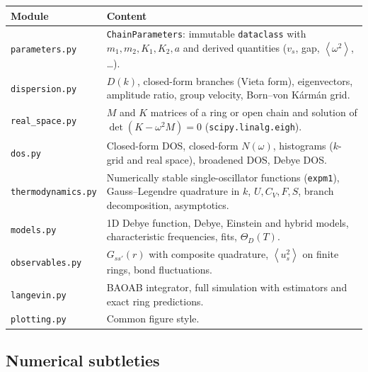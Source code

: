 \documentclass[11pt,a4paper]{article}
\newcommand{\avg}[1]{\left\langle #1\right\rangle}
\newcommand{\vs}{v_{s}}
\newcommand{\code}[1]{\texttt{#1}}
\begin{document}
\begin{center}
\small
\begin{tabularx}{\textwidth}{@{}l X@{}}
\toprule
Module & Content\\
\midrule
\code{parameters.py} & \code{ChainParameters}: immutable \code{dataclass} with $m_1,m_2,K_1,K_2,a$ and derived quantities ($\vs$, gap, $\avg{\omega^2}$, \dots).\\
\code{dispersion.py} & $D(k)$, closed-form branches (Vieta form), eigenvectors, amplitude ratio, group velocity, Born–von Kármán grid.\\
\code{real\_space.py} & $M$ and $K$ matrices of a ring or open chain and solution of $\det(K-\omega^2M)=0$ (\code{scipy.linalg.eigh}).\\
\code{dos.py} & Closed-form DOS, closed-form $N(\omega)$, histograms ($k$-grid and real space), broadened DOS, Debye DOS.\\
\code{thermodynamics.py} & Numerically stable single-oscillator functions (\code{expm1}), Gauss–Legendre quadrature in $k$, $U,C_V,F,S$, branch decomposition, asymptotics.\\
\code{models.py} & 1D Debye function, Debye, Einstein and hybrid models, characteristic frequencies, fits, $\Theta_D(T)$.\\
\code{observables.py} & $G_{ss'}(r)$ with composite quadrature, $\avg{u_s^2}$ on finite rings, bond fluctuations.\\
\code{langevin.py} & BAOAB integrator, full simulation with estimators and exact ring predictions.\\
\code{plotting.py} & Common figure style.\\
\bottomrule
\end{tabularx}
\end{center}

\subsection{Numerical subtleties}
\end{document}
